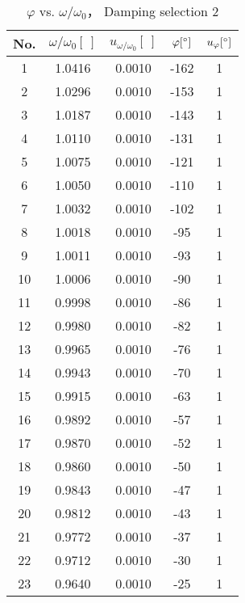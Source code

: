 \begin{table}[H]
\centering
\begin{tabular}{|c|c|c|c|c|}
\hline
No. & $\omega/\omega_0[\ ]$ & $u_{\omega/\omega_0}[\ ]$ & $\varphi[^\circ]$ & $u_{\varphi}[^\circ]$\\\hline 
                1 & 1.0416 & 0.0010 & -162 & 1\\\hline
                2 & 1.0296 & 0.0010 & -153 & 1\\\hline
                3 & 1.0187 & 0.0010 & -143 & 1\\\hline
                4 & 1.0110 & 0.0010 & -131 & 1\\\hline
                5 & 1.0075 & 0.0010 & -121 & 1\\\hline
                6 & 1.0050 & 0.0010 & -110 & 1\\\hline
                7 & 1.0032 & 0.0010 & -102 & 1\\\hline
                8 & 1.0018 & 0.0010 & -95 & 1\\\hline
                9 & 1.0011 & 0.0010 & -93 & 1\\\hline
                10 & 1.0006 & 0.0010 & -90 & 1\\\hline
                11 & 0.9998 & 0.0010 & -86 & 1\\\hline
                12 & 0.9980 & 0.0010 & -82 & 1\\\hline
                13 & 0.9965 & 0.0010 & -76 & 1\\\hline
                14 & 0.9943 & 0.0010 & -70 & 1\\\hline
                15 & 0.9915 & 0.0010 & -63 & 1\\\hline
                16 & 0.9892 & 0.0010 & -57 & 1\\\hline
                17 & 0.9870 & 0.0010 & -52 & 1\\\hline
                18 & 0.9860 & 0.0010 & -50 & 1\\\hline
                19 & 0.9843 & 0.0010 & -47 & 1\\\hline
                20 & 0.9812 & 0.0010 & -43 & 1\\\hline
                21 & 0.9772 & 0.0010 & -37 & 1\\\hline
                22 & 0.9712 & 0.0010 & -30 & 1\\\hline
                23 & 0.9640 & 0.0010 & -25 & 1\\\hline
            \end{tabular}
            \caption{$\varphi$ vs. $\omega/\omega_0$， Damping selection 2}\label{data_phi2}
        \end{table}

